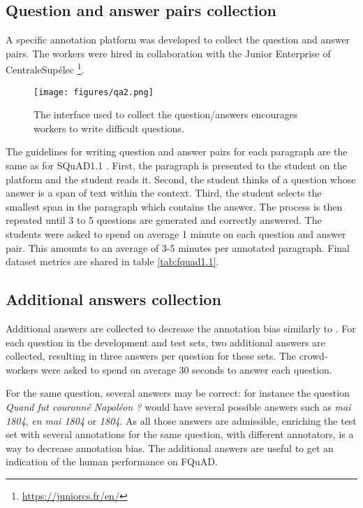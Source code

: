 \documentclass{article}
\begin{document}
\subsection{Question and answer pairs collection}

A specific annotation platform was developed to collect the question and answer pairs.
The workers were hired in collaboration with the Junior Enterprise of CentraleSupélec \footnote{\url{https://juniorcs.fr/en/}}.

\begin{figure}[ht]
    \centering
    \texttt{[image: figures/qa2.png]}
    \caption{The interface used to collect the question/answers encourages workers to write difficult questions.}
\end{figure}

The guidelines for writing question and answer pairs for each paragraph are the same as for SQuAD1.1 \citep{rajpurkar-etal-2016-squad}.
First, the paragraph is presented to the student on the platform and the student reads it.
Second, the student thinks of a question whose answer is a span of text within the context. 
Third, the student selects the smallest span in the paragraph which contains the answer. 
The process is then repeated until 3 to 5 questions are generated and correctly answered. 
The students were asked to spend on average 1 minute on each question and answer pair.
This amounts to an average of 3-5 minutes per annotated paragraph.
Final dataset metrics are shared in table \ref{tab:fquad1.1}.

\subsection{Additional answers collection}

Additional answers are collected to decrease the annotation bias similarly to \citep{rajpurkar-etal-2016-squad}.
For each question in the development and test sets, two additional answers are collected, resulting in three answers per question for these sets.
The crowd-workers were asked to spend on average 30 seconds to answer each question.

For the same question, several answers may be correct: for instance the question \textit{Quand fut couronné Napoléon ?} would have several possible answers such as \textit{mai 1804}, \textit{en mai 1804} or \textit{1804}.
As all those answers are admissible, enriching the test set with several annotations for the same question, with different annotators, is a way to decrease annotation bias. 
The additional answers are useful to get an indication of the human performance on FQuAD. 
\end{document}

